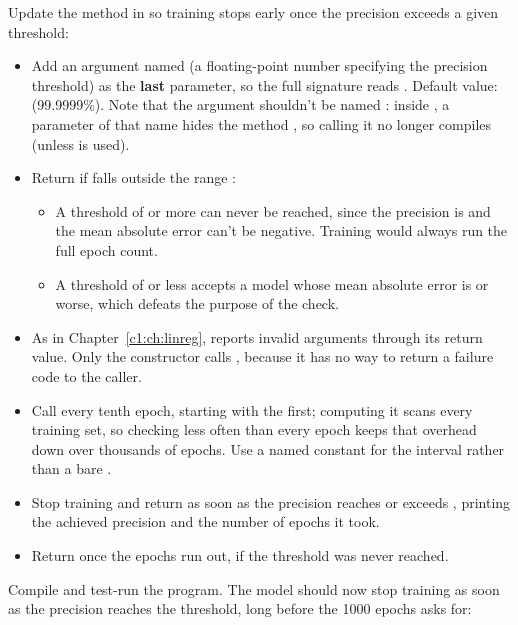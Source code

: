 \label{c2:ex:8}
Update the method  in  so training stops early once
the precision exceeds a given threshold:
\begin{itemize}
  \item Add an argument named  (a floating-point number specifying the
    precision threshold) as the \textbf{last} parameter, so the full signature reads
    . Default value:
     (99.9999\%). Note that the argument shouldn't be named : inside
    , a parameter of that name hides the method , so calling it no
    longer compiles (unless  is used).
  \item Return  if  falls outside the range
    :
  \begin{itemize}
    \item A threshold of  or more can never be reached, since the precision is
       and the mean absolute error can't be negative. Training would always run the
      full epoch count.
    \item A threshold of  or less accepts a model whose mean absolute error is 
      or worse, which defeats the purpose of the check.
  \end{itemize}
  \item As in Chapter~\ref{c1:ch:linreg},  reports invalid arguments through its
    return value. Only the constructor calls , because it has no way to
    return a failure code to the caller.
  \item Call  every tenth epoch, starting with the first; computing it scans every
    training set, so checking less often than every epoch keeps that overhead down over thousands
    of epochs. Use a named constant for the interval rather than a bare .
  \item Stop training and return  as soon as the precision reaches or exceeds
    , printing the achieved precision and the number of epochs it took.
  \item Return  once the epochs run out, if the threshold was never reached.
\end{itemize}

\label{c2:ex:9}
Compile and test-run the program. The model should now stop training as soon as the precision
reaches the threshold, long before the 1000 epochs  asks for:

